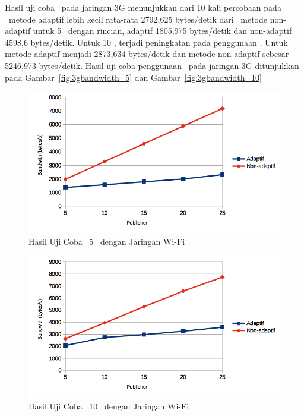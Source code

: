 Hasil uji coba \bandwidth~pada jaringan 3G menunjukkan dari 10 kali percobaan
pada \tracking~metode adaptif lebih kecil rata-rata 2792,625 bytes/detik dari
\tracking~metode non-adaptif untuk 5 \subscriber~dengan rincian, adaptif
1805,975 bytes/detik dan non-adaptif 4598,6 bytes/detik. Untuk 10 \subscriber,
terjadi peningkatan pada penggunaan \bandwidth. Untuk metode adaptif menjadi
2873,634 bytes/detik dan metode non-adaptif sebesar 5246,973 bytes/detik. Hasil
uji coba penggunaan \bandwidth~pada jaringan 3G ditunjukkan pada
Gambar~\ref{fig:3gbandwidth_5} dan Gambar~\ref{fig:3gbandwidth_10}

\noindent
\begin{figure}
  \centering
  \includegraphics[scale=0.90]
	{images/4-bandwidth5.png}
	\caption{Hasil Uji Coba \Bandwidth~5 \Subscriber~dengan Jaringan Wi-Fi}
\label{fig:bandwidth_5}
\end{figure}
\noindent

\begin{figure}
  \centering
  \includegraphics[scale=0.90]
	{images/4-bandwidth10.png}
	\caption{Hasil Uji Coba \Bandwidth~10 \Subscriber~dengan Jaringan Wi-Fi}
\label{fig:bandwidth_10}
\end{figure}

